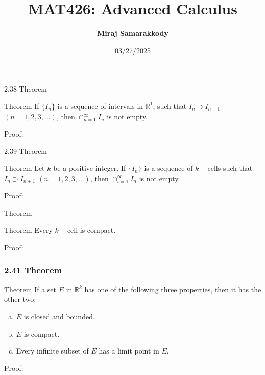 \documentclass{beamer}
\title{MAT426: Advanced Calculus}
\author{\textbf{Miraj Samarakkody}}
\institute{Tougaloo College}
\date{03/27/2025}
\begin{document}
\begin{frame}
    \titlepage
\end{frame}



\begin{frame}{2.38 Theorem}
\begin{block}{Theorem}
If \(\{I_n\}\) is a sequence of intervals in \(\mathbb{R}^1\), such that \(I_n \supset I_{n+1}\) \((n=1,2,3,\dots)\), then \(\cap_{n=1}^\infty I_n\) is not empty. 
\end{block}
\begin{block}{Proof:}

\end{block}
\end{frame}

\begin{frame}{2.39 Theorem}
\begin{block}{Theorem}
Let \(k\) be a positive integer. If \(\{I_n\}\) is a sequence of \(k-\)cells such that \(I_n \supset I_{n+1}\) \((n=1,2,3,\dots)\), then \(\cap_{i=1}^\infty I_n\) is not empty. 
\end{block}
\begin{block}{Proof:}

\end{block}
\end{frame}

\begin{frame}{Theorem}
\begin{block}{Theorem}
Every \(k-\)cell is compact.
\end{block}
\begin{block}{Proof:}

\end{block}
\end{frame}

\begin{frame}
    \frametitle{2.41 Theorem}

    \begin{block}{Theorem}
        If a set \(E\) in \(\mathbb{R}^k\) has one of the following three properties, then it has the other two: 
        \begin{enumerate}[(a)]
            \item \(E\) is closed and bounded.
            \item \(E\) is compact. 
            \item Every infinite subset of \(E\) has a limit point in \(E\).
        \end{enumerate}
    \end{block}
    \begin{block}{Proof:}
        
    \end{block}

\end{frame}
\end{document}
